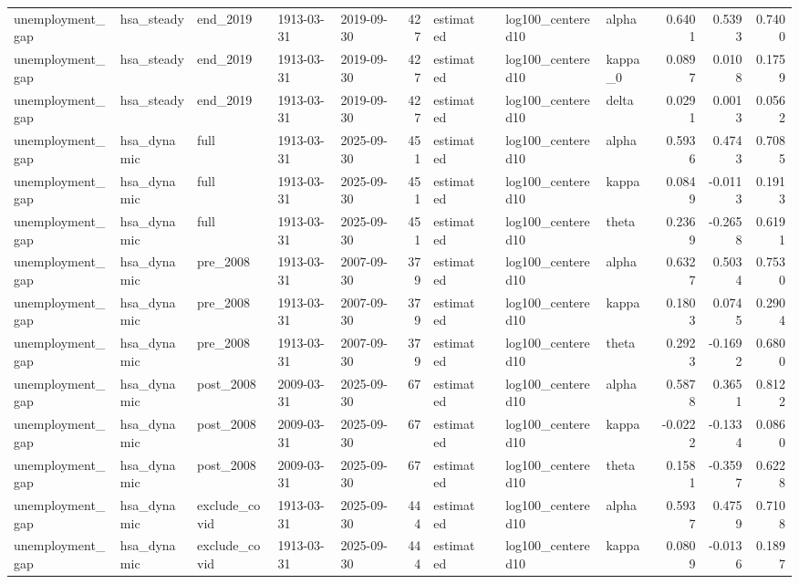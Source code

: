 \begin{tabular}{lllllrllllrrr}
unemployment\_gap & hsa\_steady & end\_2019 & 1913-03-31 & 2019-09-30 & 427 & estimated &  & log100\_centered10 & alpha & 0.6401 & 0.5393 & 0.7400 \\
unemployment\_gap & hsa\_steady & end\_2019 & 1913-03-31 & 2019-09-30 & 427 & estimated &  & log100\_centered10 & kappa\_0 & 0.0897 & 0.0108 & 0.1759 \\
unemployment\_gap & hsa\_steady & end\_2019 & 1913-03-31 & 2019-09-30 & 427 & estimated &  & log100\_centered10 & delta & 0.0291 & 0.0013 & 0.0562 \\
unemployment\_gap & hsa\_dynamic & full & 1913-03-31 & 2025-09-30 & 451 & estimated &  & log100\_centered10 & alpha & 0.5936 & 0.4743 & 0.7085 \\
unemployment\_gap & hsa\_dynamic & full & 1913-03-31 & 2025-09-30 & 451 & estimated &  & log100\_centered10 & kappa & 0.0849 & -0.0113 & 0.1913 \\
unemployment\_gap & hsa\_dynamic & full & 1913-03-31 & 2025-09-30 & 451 & estimated &  & log100\_centered10 & theta & 0.2369 & -0.2658 & 0.6191 \\
unemployment\_gap & hsa\_dynamic & pre\_2008 & 1913-03-31 & 2007-09-30 & 379 & estimated &  & log100\_centered10 & alpha & 0.6327 & 0.5034 & 0.7530 \\
unemployment\_gap & hsa\_dynamic & pre\_2008 & 1913-03-31 & 2007-09-30 & 379 & estimated &  & log100\_centered10 & kappa & 0.1803 & 0.0745 & 0.2904 \\
unemployment\_gap & hsa\_dynamic & pre\_2008 & 1913-03-31 & 2007-09-30 & 379 & estimated &  & log100\_centered10 & theta & 0.2923 & -0.1692 & 0.6800 \\
unemployment\_gap & hsa\_dynamic & post\_2008 & 2009-03-31 & 2025-09-30 & 67 & estimated &  & log100\_centered10 & alpha & 0.5878 & 0.3651 & 0.8122 \\
unemployment\_gap & hsa\_dynamic & post\_2008 & 2009-03-31 & 2025-09-30 & 67 & estimated &  & log100\_centered10 & kappa & -0.0222 & -0.1334 & 0.0860 \\
unemployment\_gap & hsa\_dynamic & post\_2008 & 2009-03-31 & 2025-09-30 & 67 & estimated &  & log100\_centered10 & theta & 0.1581 & -0.3597 & 0.6228 \\
unemployment\_gap & hsa\_dynamic & exclude\_covid & 1913-03-31 & 2025-09-30 & 444 & estimated &  & log100\_centered10 & alpha & 0.5937 & 0.4759 & 0.7108 \\
unemployment\_gap & hsa\_dynamic & exclude\_covid & 1913-03-31 & 2025-09-30 & 444 & estimated &  & log100\_centered10 & kappa & 0.0809 & -0.0136 & 0.1897 \\

\end{tabular}
